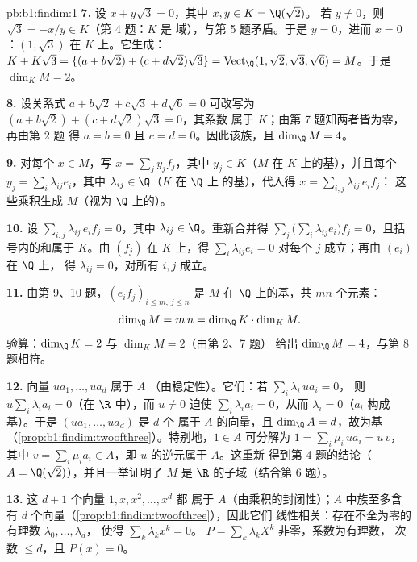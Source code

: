 \begin{solution}{pb:b1:findim:1}
\textbf{7.} 设 $x + y\sqrt3 = 0$，其中 $x, y \in K = \Q(\sqrt2)$。
若 $y \neq 0$，则 $\sqrt3 = -x/y \in K$（第 4 题：$K$ 是
域），与第 5 题矛盾。于是 $y = 0$，进而 $x = 0$：$(1,
\sqrt3)$ 在 $K$ 上。它生成：$K + K\sqrt3 =
\{(a + b\sqrt2) + (c + d\sqrt2)\sqrt3\} = \operatorname{Vect}_\Q
(1, \sqrt2, \sqrt3, \sqrt6) = M$。于是 $\dim_K M = 2$。

\textbf{8.} 设关系式 $a + b\sqrt2 + c\sqrt3 + d\sqrt6 = 0$
可改写为 $(a + b\sqrt2) + (c + d\sqrt2)\sqrt3 = 0$，其系数
属于 $K$；由第 7 题知两者皆为零，再由第 2 题
得 $a = b = 0$ 且 $c = d = 0$。因此该族，且 $\dim_\Q M
= 4$。

\textbf{9.} 对每个 $x \in M$，写 $x = \sum_j y_j f_j$，其中 $y_j
\in K$（$M$ 在 $K$ 上的基），并且每个 $y_j = \sum_i
\lambda_{ij} e_i$，其中 $\lambda_{ij} \in \Q$（$K$ 在 $\Q$ 上
的基），代入得 $x = \sum_{i,j} \lambda_{ij}\, e_i f_j$：
这些乘积生成 $M$（视为 $\Q$ 上的）。

\textbf{10.} 设 $\sum_{i,j} \lambda_{ij}\, e_i f_j = 0$，其中
$\lambda_{ij} \in \Q$。重新合并得 $\sum_j \bigl(\sum_i \lambda_{ij}
e_i\bigr) f_j = 0$，且括号内的和属于 $K$。由
$(f_j)$ 在 $K$ 上，得 $\sum_i \lambda_{ij} e_i = 0$
对每个 $j$ 成立；再由 $(e_i)$ 在 $\Q$ 上，
得 $\lambda_{ij} = 0$，对所有 $i, j$ 成立。

\textbf{11.} 由第 9、10 题，$(e_i f_j)_{i \leq m,\, j
\leq n}$ 是 $M$ 在 $\Q$ 上的基，共 $mn$ 个元素：
\[
\dim_\Q M = m\,n = \dim_\Q K \cdot \dim_K M .
\]
验算：$\dim_\Q K = 2$ 与 $\dim_K M = 2$（由第 2、7 题）
给出 $\dim_\Q M = 4$，与第 8 题相符。

\textbf{12.} 向量 $u a_1, \dots, u a_d$ 属于 $A$
（由稳定性）。它们：若 $\sum_i \lambda_i\, u a_i = 0$，
则 $u \sum_i \lambda_i a_i = 0$（在 $\R$ 中），而 $u \neq 0$ 迫使
$\sum_i \lambda_i a_i = 0$，从而 $\lambda_i = 0$（$a_i$ 构成
基）。于是 $(u a_1, \dots, u a_d)$ 是 $d$ 个
属于 $A$ 的向量，且 $\dim_\Q A = d$，故为基
（\cref{prop:b1:findim:twoofthree}）。特别地，$1 \in A$
可分解为 $1 = \sum_i \mu_i\, u a_i = u\,v$，其中 $v = \sum_i
\mu_i a_i \in A$，即 $u$ 的逆元属于 $A$。这重新
得到第 4 题的结论（$A = \Q(\sqrt2)$），并且一举证明了 $M$
是 $\R$ 的子域（结合第 6 题）。

\textbf{13.} 这 $d + 1$ 个向量 $1, x, x^2, \dots, x^{d}$ 都
属于 $A$（由乘积的封闭性）；$A$ 中族至多含有
$d$ 个向量（\cref{prop:b1:findim:twoofthree}），因此它们
线性相关：存在不全为零的有理数 $\lambda_0, \dots, \lambda_d$，
使得 $\sum_k \lambda_k x^k = 0$。 $P
= \sum_k \lambda_k X^k$ 非零，系数为有理数，
次数 $\leq d$，且 $P(x) = 0$。


\end{solution}
